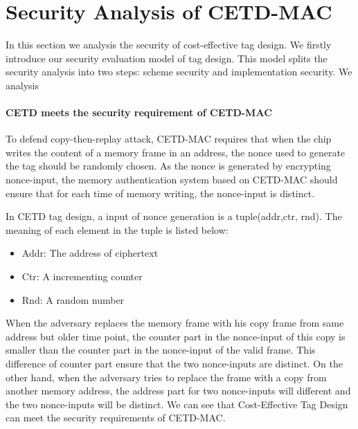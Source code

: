 
%
\section{Security Analysis of CETD-MAC}
In this section we analysis the security of cost-effective tag design. We firstly introduce our security evaluation model of tag design. This model splits the security analysis into two steps: scheme security and implementation security. We analysis 
\paragraph{CETD meets the security requirement of CETD-MAC}
To defend copy-then-replay attack, CETD-MAC requires that when the chip writes
the content of a memory frame in an address, the nonce used to generate the tag
should be randomly chosen. As the nonce is generated by encrypting nonce-input,
the memory authentication system based on CETD-MAC should ensure that for each
time of memory writing, the nonce-input is distinct.

In CETD tag design, a input of nonce generation is a tuple(addr,ctr, rnd). The meaning of each element in the tuple is listed below: 
\begin{itemize}
	\item Addr: The address of ciphertext
	\item Ctr: A incrementing counter 
	\item Rnd: A random number
\end{itemize}
When the adversary replaces the memory frame with his copy frame from same
address but older time point, the counter part in the nonce-input of this copy
is smaller than the counter part in the nonce-input of the valid frame. This
difference of counter part ensure that the two nonce-inputs are distinct. 
On the other hand, when the adversary tries to replace the frame with a copy
from another memory address, the address part for two nonce-inputs will
different and the two nonce-inputs will be distinct.
We can see that Cost-Effective Tag Design can meet the security requirements of
CETD-MAC.

